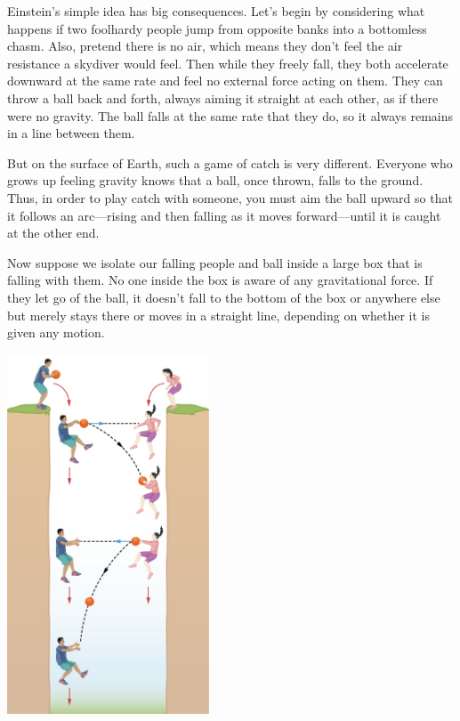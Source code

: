 \documentclass{article}
\numberwithin{equation}{section}
\numberwithin{figure}{section}
\begin{document}
\begin{minipage}{0.53\textwidth}
Einstein's simple idea has big consequences. Let's begin by considering what happens if two foolhardy people jump from opposite banks into a bottomless chasm. Also, pretend there is no air, which means they don't feel the air resistance a skydiver would feel. Then while they freely fall, they both accelerate downward at the same rate and feel no external force acting on them. They can throw a ball back and forth, always aiming it straight at each other, as if there were no gravity. The ball falls at the same rate that they do, so it always remains in a line between them.
\vspace{1em}

But on the surface of Earth, such a game of catch is very different.  Everyone who grows up feeling gravity knows that a ball, once thrown, falls to the ground. Thus, in order to play catch with someone, you must aim the ball upward so that it follows an arc---rising and then falling as it moves forward---until it is caught at the other end.
\vspace{1em}

Now suppose we isolate our falling people and ball inside a large box that is falling with them. No one inside the box is aware of any gravitational force. If they let go of the ball, it doesn't fall to the bottom of the box or anywhere else but merely stays there or moves in a straight line, depending on whether it is given any motion.
\end{minipage}%
\hspace{5mm}
\begin{minipage}{0.37\textwidth}
\centering
    \includegraphics[width=6cm]{Figures/Figure24.4.jpg}
\end{minipage}
\vspace{1em}
\end{document}
